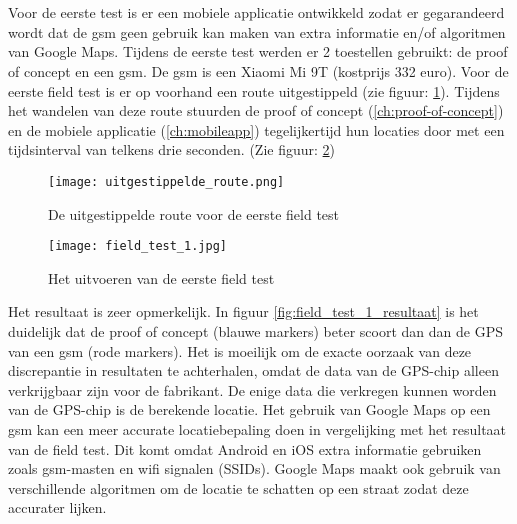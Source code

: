 \section{}
Voor de eerste test is er een mobiele applicatie ontwikkeld zodat er gegarandeerd wordt dat de gsm geen gebruik kan maken van extra informatie en/of algoritmen van Google Maps.
\newline
Tijdens de eerste test werden er 2 toestellen gebruikt: de proof of concept en een gsm. De gsm is een Xiaomi Mi 9T (kostprijs 332 euro).
Voor de eerste field test is er op voorhand een route uitgestippeld (zie figuur: \ref{fig:uitgestippelde_route}). Tijdens het wandelen van deze route stuurden de proof of concept (\ref{ch:proof-of-concept}) en de mobiele applicatie (\ref{ch:mobileapp}) tegelijkertijd hun locaties door met een tijdsinterval van telkens drie seconden. (Zie figuur: \ref{fig:field_test_1})
\begin{figure}
	\texttt{[image: uitgestippelde\_route.png]}
	\caption{De uitgestippelde route voor de eerste field test}
	\label{fig:uitgestippelde_route}
\end{figure}
\begin{figure}
	\texttt{[image: field\_test\_1.jpg]}
	\caption{Het uitvoeren van de eerste field test}
	\label{fig:field_test_1}
\end{figure}
\newline
\newline
Het resultaat is zeer opmerkelijk. In figuur \ref{fig:field_test_1_resultaat} is het duidelijk dat de proof of concept (blauwe markers) beter scoort dan dan de GPS van een gsm (rode markers). Het is moeilijk om de exacte oorzaak van deze discrepantie in resultaten te achterhalen, omdat de data van de GPS-chip alleen verkrijgbaar zijn voor de fabrikant. De enige data die verkregen kunnen worden van de GPS-chip is de berekende locatie. 
\newline
Het gebruik van Google Maps op een gsm kan een meer accurate locatiebepaling doen in vergelijking met het resultaat van de field test. Dit komt omdat Android en iOS extra informatie gebruiken zoals gsm-masten en wifi signalen (SSIDs). Google Maps maakt ook gebruik van verschillende algoritmen om de locatie te schatten op een straat zodat deze accurater lijken.
\newline
